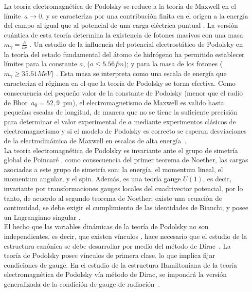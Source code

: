 \documentclass[a4paper,12pt]{article}
\begin{document}
La teoría electromagnética de Podolsky se reduce a la teoría de Maxwell en el \mbox{límite $a\rightarrow0$,} y se caracteriza por una contribución finita en el origen a la energía del campo al igual que al potencial de una carga eléctrica puntual \cite{podolsky,prueba,podolfuerza, gaualor}. La versión cuántica de esta teoría determina la existencia de fotones masivos con una masa $m_\gamma=\frac{\hbar}{ac}$ \cite{prueba,gaualor}. Un estudio de la influencia del potencial \mbox{electrostático} de Podolsky en la teoría del estado fundamental del átomo de hidrógeno ha permitido establecer límites para la constante $a$, ($a\leq5.56 fm$); y para la masa de los fotones ($ m_\gamma\geq35.51 MeV$) \cite{prueba}. Esta masa se interpreta como una escala de energía que caracteriza el régimen en el que la teoría de Podolsky se torna efectiva. Como \mbox{consecuencia} del pequeño valor de la constante de Podolsky (menor que el radio de \mbox{Bhor \mbox{$a_0=52,9$} pm),} el \mbox{electromagnetismo} de Maxwell es valido hasta pequeñas escalas de longitud, de manera que no se tiene la \mbox{suficiente} precisión para \mbox{determinar} el valor experimental de $a$ \mbox{mediante} \mbox{experimentos} clásicos de electromagnetismo y si el modelo de Podolsky es correcto se \mbox{esperan} \mbox{desviaciones} de la \mbox{electrodinámica} de Maxwell en escalas de alta \mbox{energía \cite{prueba,gaualor}.}
\\

La teoría electromagnética de Podolsky es invariante ante el grupo de simetría global de Poincaré \cite{greiner}, como consecuencia del primer teorema de Noether, las cargas asociadas a este grupo de \mbox{simetría} son: la energía, el momentum lineal, el \mbox{momentum} angular, y el spin. Además, es una teoría gauge $U(1)$, es decir, invariante por transformaciones gauges locales del cuadrivector potencial, por lo tanto, de acuerdo al segundo teorema de Noether: existe una ecuación de continuidad, se debe exigir el cumplimiento de las identidades de Bianchi, y posee un Lagrangiano singular \cite{vinculos,local}. 
\\

El hecho que las variables dinámicas de la teoría de Podolsky no son independientes, es decir, que existen vínculos \cite{podolsky,forhaljdpo}, hace necesario que el estudio de la estructura canónica se debe desarrollar por medio del método de \mbox{Dirac \cite{dirac}.} La teoría de Podolsky posee vínculos de primera clase, lo que implica fijar condiciones de gauge. En el estudio de la estructura Hamiltoniana de la teoría electromagnética de Podolsky vía método de Dirac, se impondrá la versión generalizada de la condición de gauge de \mbox{radiación \cite{podolsky}.}
\end{document}
